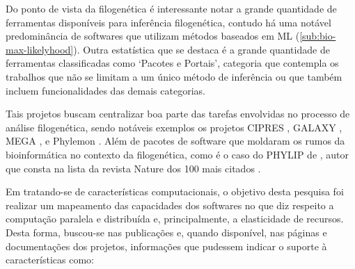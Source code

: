\documentclass[english,brazilian]{UNISINOSmonografia} %
\begin{document}


Do ponto de vista da filogenética é interessante notar a grande quantidade de ferramentas disponíveis para inferência filogenética, contudo há uma notável predominância de softwares que utilizam métodos baseados em ML (\autoref{sub:bio-max-likelyhood}).
Outra estatística que se destaca é a grande quantidade de ferramentas classificadas como `Pacotes e Portais', categoria que contempla os trabalhos que não se limitam a um único método de inferência ou que também incluem funcionalidades das demais categorias.


Tais projetos buscam centralizar boa parte das tarefas envolvidas no processo de análise filogenética, sendo notáveis exemplos os projetos CIPRES \cite{Miller2010}, GALAXY \cite{Afgan2016}, MEGA \cite{Kumar2016}, e Phylemon \cite{Tarraga2007,Sanchez2011}.
Além de pacotes de software que moldaram os rumos da bioinformática no contexto da filogenética, como é o caso do PHYLIP de , autor que consta na lista da revista Nature dos 100 mais citados \cite{NatureTop100}.


Em tratando-se de características computacionais, o objetivo desta pesquisa foi realizar um mapeamento das capacidades dos softwares no que diz respeito a computação paralela e distribuída e, principalmente, a elasticidade de recursos.
Desta forma, buscou-se nas publicações e, quando disponível, nas páginas e documentações dos projetos, informações que pudessem indicar o suporte à características como:
\end{document}
